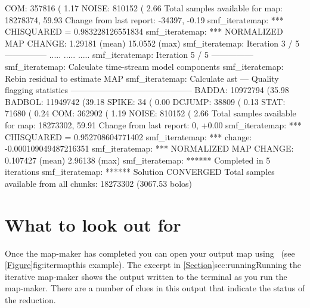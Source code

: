 \documentclass[11pt,oneside,chapters]{starlink}
\begin{document}
\begin{terminalv}
   COM:     357816 ( 1.17%
 NOISE:     810152 ( 2.66%
Total samples available for map:   18278374, 59.93%
     Change from last report:     -34397, -0.19%
smf_iteratemap: *** CHISQUARED = 0.983228126551834
smf_iteratemap: *** NORMALIZED MAP CHANGE: 1.29181 (mean) 15.0552 (max)
smf_iteratemap: Iteration 3 / 5 ---------------
.....
.....
.....
smf_iteratemap: Iteration 5 / 5 ---------------
smf_iteratemap: Calculate time-stream model components
smf_iteratemap: Rebin residual to estimate MAP
smf_iteratemap: Calculate ast
--- Quality flagging statistics --------------------------------------------
 BADDA:   10972794 (35.98%
BADBOL:   11949742 (39.18%
 SPIKE:         34 ( 0.00%
DCJUMP:      38809 ( 0.13%
  STAT:      71680 ( 0.24%
   COM:     362902 ( 1.19%
 NOISE:     810152 ( 2.66%
Total samples available for map:   18273302, 59.91%
     Change from last report:          0, +0.00%
smf_iteratemap: *** CHISQUARED = 0.952708604771402
smf_iteratemap: *** change: -0.000109049487216351
smf_iteratemap: *** NORMALIZED MAP CHANGE: 0.107427 (mean) 2.96138 (max)
smf_iteratemap: ****** Completed in 5 iterations
smf_iteratemap: ****** Solution CONVERGED
Total samples available from all chunks: 18273302 (3067.53 bolos)
\end{terminalv}



\section{What to look out for}
\flushbottom

Once the map-maker has completed you can open your output map using
\gaia\ (see \cref{Figure}{fig:itermap}{this example}). The excerpt in
\cref{Section}{sec:running}{Running the iterative map-maker} shows the
output written to the terminal as you run the map-maker. There are a
number of clues in this output that indicate the status of the
reduction.

\begin{latexonly}
\end{latexonly}
\end{document}
